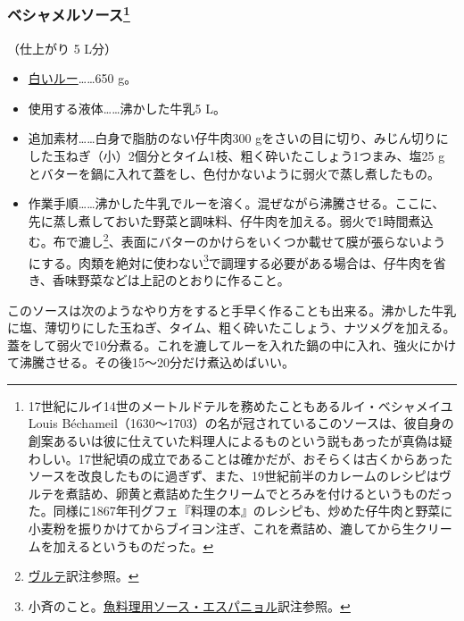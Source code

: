 \begin{recette}
\atoaki{}

\hypertarget{sauce-bechamel}{%
\subsubsection[ベシャメルソース]{\texorpdfstring{ベシャメルソース\footnote{17世紀にルイ14世のメートルドテルを務めたこともあるルイ・ベシャメイユLouis
  Béchameil（1630〜1703）の名が冠されているこのソースは、彼自身の創案あるいは彼に仕えていた料理人によるものという説もあったが真偽は疑わしい。17世紀頃の成立であることは確かだが、おそらくは古くからあったソースを改良したものに過ぎず、また、19世紀前半のカレームのレシピはヴルテを煮詰め、卵黄と煮詰めた生クリームでとろみを付けるというものだった。同様に1867年刊グフェ『料理の本』のレシピも、炒めた仔牛肉と野菜に小麦粉を振りかけてからブイヨン注ぎ、これを煮詰め、漉してから生クリームを加えるというものだった。}}{ベシャメルソース}}\label{sauce-bechamel}}


 

（仕上がり 5 L分）

\begin{itemize}
\item
  \protect\hyperlink{roux-blanc}{白いルー}\ldots{}\ldots{}650 g。
\item
  使用する液体\ldots{}\ldots{}沸かした牛乳5 L。
\item
  追加素材\ldots{}\ldots{}白身で脂肪のない仔牛肉300
  gをさいの目に切り、みじん切りにした玉ねぎ（小）2個分とタイム1枝、粗く砕いたこしょう1つまみ、塩25
  g とバターを鍋に入れて蓋をし、色付かないように弱火で蒸し煮したもの。
\item
  作業手順\ldots{}\ldots{}沸かした牛乳でルーを溶く。混ぜながら沸騰させる。ここに、先に蒸し煮しておいた野菜と調味料、仔牛肉を加える。弱火で1時間煮込む。布で漉し\footnote{\protect\hyperlink{veloute}{ヴルテ}訳注参照。}、表面にバターのかけらをいくつか載せて膜が張らないようにする。肉類を絶対に使わない\footnote{小斉のこと。\protect\hyperlink{sauce-espagnole-maigre}{魚料理用ソース・エスパニョル}訳注参照。}で調理する必要がある場合は、仔牛肉を省き、香味野菜などは上記のとおりに作ること。
\end{itemize}

このソースは次のようなやり方をすると手早く作ることも出来る。沸かした牛乳に塩、薄切りにした玉ねぎ、タイム、粗く砕いたこしょう、ナツメグを加える。蓋をして弱火で10分煮る。これを漉してルーを入れた鍋の中に入れ、強火にかけて沸騰させる。その後15〜20分だけ煮込めばいい。


\end{recette}
